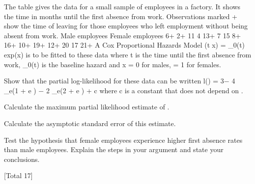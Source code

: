 \documentclass[a4paper,1pt]{article}
\begin{document}
The table gives the data for a small sample of employees in a factory. It shows
the time in months until the first absence from work. Observations marked +
show the time of leaving for those employees who left employment without being
absent from work.
Male employees
Female employees
6+
2+
11
4
13+
7
15
8+
16+
10+
19+
12+
20
17
21+
A Cox Proportional Hazards Model
\lambda(tx) = \lambda_0(t) exp(\beta x)
is to be fitted to these data where t is the time until the first absence from work,
\lambda_0(t) is the baseline hazard and x = 0 for males, = 1 for females.
\item 
Show that the partial log-likelihood for these data can be written
l(\beta) = 3\beta − 4 \log_{e}(1 + e \beta ) − 2 \log_{e}(2 + e \beta ) + c
where c is a constant that does not depend on \beta.

\item  Calculate the maximum partial likelihood estimate of \beta.

\item  Calculate the asymptotic standard error of this estimate.

\item  Test the hypothesis that female employees experience higher first absence
rates than male employees. Explain the steps in your argument and state
your conclusions.

[Total 17]
\end{document}
